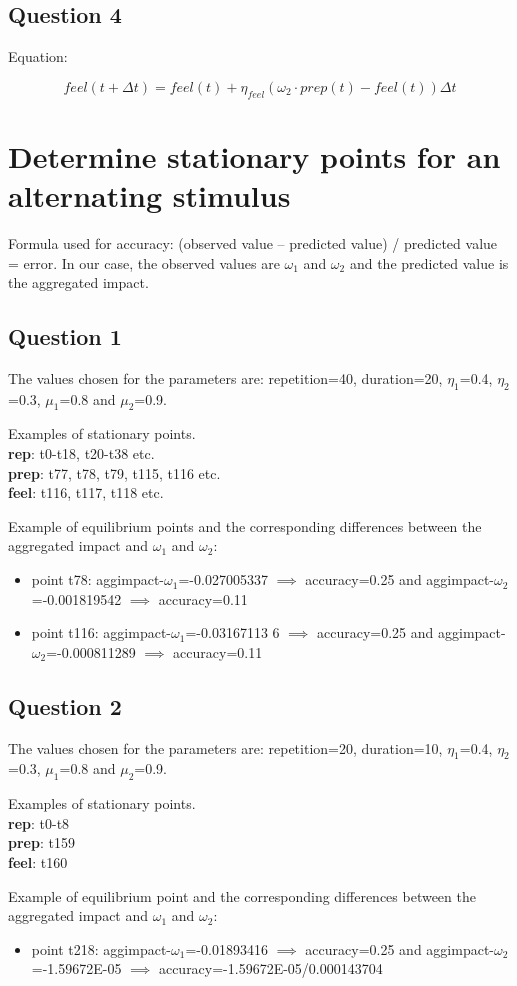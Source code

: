 \documentclass[a4paper]{article}
\begin{document}
\subsection{Question 4}

Equation:

$$
feel(t + \Delta t) = feel(t) + \eta_{feel} (\omega_{2} \cdot prep(t) - feel(t)) \Delta t
$$

\section{Determine stationary points for an alternating stimulus}

Formula used for accuracy: (observed value – predicted value) / predicted value = error. In our case, the observed values are $\omega_{1}$ and $\omega_{2}$ and the predicted value is the aggregated impact.

\subsection{Question 1}

The values chosen for the parameters are: repetition=40, duration=20, $\eta_{1}$=0.4, $\eta_{2}$=0.3, $\mu_{1}$=0.8 and $\mu_{2}$=0.9.

Examples of stationary points. \\
\textbf{rep}: t0-t18, t20-t38 etc. \\
\textbf{prep}: t77, t78, t79, t115, t116 etc.	\\
\textbf{feel}: t116, t117, t118 etc.

Example of equilibrium points and the corresponding differences between the aggregated impact and $\omega_{1}$ and $\omega_{2}$:
\begin{itemize}
\item point t78: aggimpact-$\omega_{1}$=-0.027005337 $\implies$ accuracy=0.25 and aggimpact-$\omega_{2}$=-0.001819542 $\implies$ accuracy=0.11 
\item point t116: aggimpact-$\omega_{1}$=-0.03167113 6 $\implies$ accuracy=0.25 and aggimpact-$\omega_{2}$=-0.000811289 $\implies$ accuracy=0.11
\end{itemize}

\subsection{Question 2}

The values chosen for the parameters are: repetition=20, duration=10, $\eta_{1}$=0.4, $\eta_{2}$=0.3, $\mu_{1}$=0.8 and $\mu_{2}$=0.9.

Examples of stationary points. \\
\textbf{rep}: t0-t8 \\
\textbf{prep}: t159 	\\
\textbf{feel}: t160

Example of equilibrium point and the corresponding differences between the aggregated impact and $\omega_{1}$ and $\omega_{2}$:
\begin{itemize}
\item point t218: aggimpact-$\omega_{1}$=-0.01893416 $\implies$ accuracy=0.25 and aggimpact-$\omega_{2}$=-1.59672E-05 $\implies$ accuracy=-1.59672E-05/0.000143704
\end{itemize} 
\end{document}
